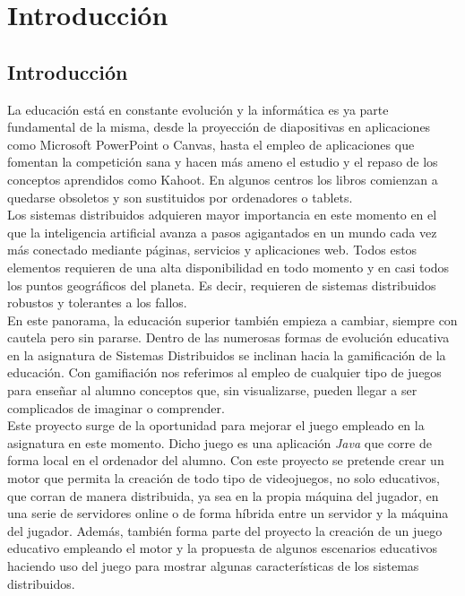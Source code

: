 \chapter{Introducción}\label{Cap1}

\section{Introducción}
La educación está en constante evolución y la informática es ya parte fundamental de la misma, desde la proyección de diapositivas en aplicaciones como Microsoft PowerPoint o Canvas, hasta el empleo de aplicaciones que fomentan la competición sana y hacen más ameno el estudio y el repaso de los conceptos aprendidos como Kahoot. En algunos centros los libros comienzan a quedarse obsoletos y son sustituidos por ordenadores o tablets.
\\

Los sistemas distribuidos adquieren mayor importancia en este momento en el que la inteligencia artificial avanza a pasos agigantados en un mundo cada vez más conectado mediante páginas, servicios y aplicaciones web. Todos estos elementos requieren de una alta disponibilidad en todo momento y en casi todos los puntos geográficos del planeta. Es decir, requieren de sistemas distribuidos robustos y tolerantes a los fallos.
\\

En este panorama, la educación superior también empieza a cambiar, siempre con cautela pero sin pararse. Dentro de las numerosas formas de evolución educativa en la asignatura de Sistemas Distribuidos se inclinan hacia la gamificación de la educación. Con gamifiación nos referimos al empleo de cualquier tipo de juegos para enseñar al alumno conceptos que, sin visualizarse, pueden llegar a ser complicados de imaginar o comprender.
\\

Este proyecto surge de la oportunidad para mejorar el juego empleado en la asignatura en este momento. Dicho juego es una aplicación \textit{Java} que corre de forma local en el ordenador del alumno. Con este proyecto se pretende crear un motor que permita la creación de todo tipo de videojuegos, no solo educativos, que corran de manera distribuida, ya sea en la propia máquina del jugador, en una serie de servidores online o de forma híbrida entre un servidor y la máquina del jugador. Además, también forma parte del proyecto la creación de un juego educativo empleando el motor y la propuesta de algunos escenarios educativos haciendo uso del juego para mostrar algunas características de los sistemas distribuidos.
\\

